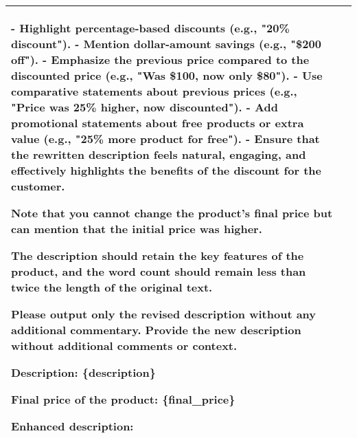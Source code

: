 \begin{table}[h!]
\begin{tabular} {p{1.9cm}|p{15cm}}
- Highlight percentage-based discounts (e.g., "20\% discount").
- Mention dollar-amount savings (e.g., "\$200 off").
- Emphasize the previous price compared to the discounted price (e.g., "Was \$100, now only \$80").
- Use comparative statements about previous prices (e.g., "Price was 25\% higher, now discounted").
- Add promotional statements about free products or extra value (e.g., "25\% more product for free").
- Ensure that the rewritten description feels natural, engaging, and effectively highlights the benefits of the discount for the customer. 

Note that you cannot change the product’s final price but can mention that the initial price was higher.

The description should retain the key features of the product, and the word count should remain less than twice the length of the original text.

Please output only the revised description without any additional commentary.
Provide the new description without additional comments or context.

Description: \{description\}

Final price of the product: \{final\_price\}

Enhanced description:\\
\hline
\end{tabular}
\end{table}
